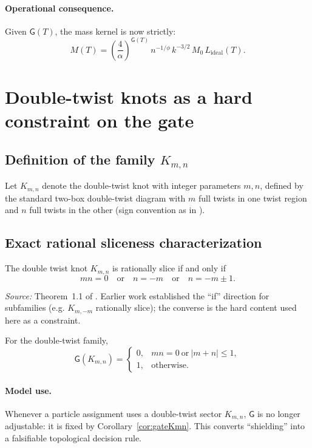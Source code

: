 \documentclass[11pt, a4paper]{article}
\begin{document}
\paragraph{Operational consequence.}
Given \(\mathsf{G}(T)\), the mass kernel is now strictly:
\[
M(T)=\left(\frac{4}{\alpha}\right)^{\mathsf{G}(T)}\,n^{-1/\phi}\,k^{-3/2}\,M_0\,L_{\mathrm{ideal}}(T).
\]

\section{Double-twist knots as a hard constraint on the gate}\label{sec:doubletwist}
\subsection{Definition of the family \(K_{m,n}\)}
\begin{definition}\label{def:Kmn}
Let \(K_{m,n}\) denote the double-twist knot with integer parameters \(m,n\), defined by the standard two-box double-twist diagram with
\(m\) full twists in one twist region and \(n\) full twists in the other (sign convention as in \cite{Lee2025DoubleTwist}).
\end{definition}

\subsection{Exact rational sliceness characterization}
\begin{theorem}\label{thm:rationalsliceKmn}
The double twist knot \(K_{m,n}\) is rationally slice if and only if
\[
mn=0 \quad\text{or}\quad n=-m \quad\text{or}\quad n=-m\pm 1.
\]
\end{theorem}
\noindent\emph{Source:} Theorem~1.1 of \cite{Lee2025DoubleTwist}.  Earlier work established the ``if'' direction for
subfamilies (e.g. \(K_{m,-m}\) rationally slice); the converse is the hard content used here as a constraint.

\begin{corollary}\label{cor:gateKmn}
For the double-twist family,
\[
\mathsf{G}(K_{m,n})=
\begin{cases}
0,& mn=0\ \text{or}\ |m+n|\le 1,\\
1,& \text{otherwise.}
\end{cases}
\]
\end{corollary}

\paragraph{Model use.}
Whenever a particle assignment uses a double-twist sector \(K_{m,n}\), \(\mathsf{G}\) is no longer adjustable: it is fixed by
Corollary~\ref{cor:gateKmn}. This converts ``shielding'' into a falsifiable topological decision rule.
\end{document}
